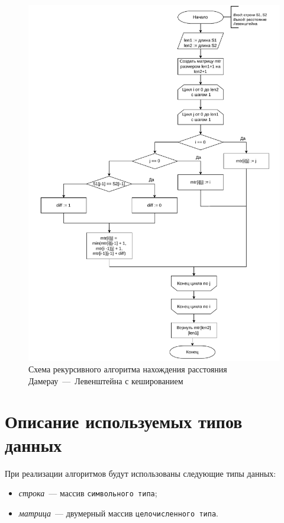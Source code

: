 \begin{figure}[h]
	\centering
	\includegraphics[height=0.9\textheight, page=5]{algo-scheme.pdf}
	\caption{Схема рекурсивного алгоритма нахождения расстояния Дамерау~---~Левенштейна с кешированием}
	\label{fig:dam-lev-rec-cache}
\end{figure}

\clearpage


\section{Описание используемых типов данных}

При реализации алгоритмов будут использованы следующие типы данных:

\begin{itemize}
    \item \textit{строка}~--- массив \texttt{символьного типа};
    \item \textit{матрица}~--- двумерный массив \texttt{целочисленного типа}.
\end{itemize}

